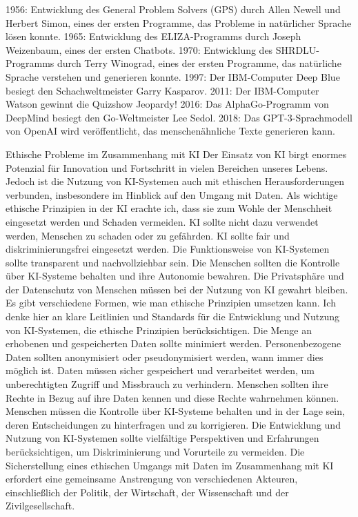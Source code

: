 \documentclass{article}
\begin{document}
1956: Entwicklung des General Problem Solvers (GPS) durch Allen Newell und Herbert Simon, eines der ersten Programme, das Probleme in natürlicher Sprache lösen konnte.
1965: Entwicklung des ELIZA-Programms durch Joseph Weizenbaum, eines der ersten Chatbots.
1970: Entwicklung des SHRDLU-Programms durch Terry Winograd, eines der ersten Programme, das natürliche Sprache verstehen und generieren konnte.
1997: Der IBM-Computer Deep Blue besiegt den Schachweltmeister Garry Kasparov.
2011: Der IBM-Computer Watson gewinnt die Quizshow Jeopardy!
2016: Das AlphaGo-Programm von DeepMind besiegt den Go-Weltmeister Lee Sedol.
2018: Das GPT-3-Sprachmodell von OpenAI wird veröffentlicht, das menschenähnliche Texte generieren kann.

Ethische Probleme im Zusammenhang mit KI
Der Einsatz von KI birgt enormes Potenzial für Innovation und Fortschritt in vielen Bereichen unseres Lebens. Jedoch ist die Nutzung von KI-Systemen auch mit ethischen Herausforderungen verbunden, insbesondere im Hinblick auf den Umgang mit Daten.
Als wichtige ethische Prinzipien in der KI erachte ich, dass sie zum Wohle der Menschheit eingesetzt werden und Schaden vermeiden.  KI sollte nicht dazu verwendet werden, Menschen zu schaden oder zu gefährden. KI sollte fair und diskriminierungsfrei eingesetzt werden. Die Funktionsweise von KI-Systemen sollte transparent und nachvollziehbar sein. Die Menschen sollten die Kontrolle über KI-Systeme behalten und ihre Autonomie bewahren. Die Privatsphäre und der Datenschutz von Menschen müssen bei der Nutzung von KI gewahrt bleiben.
Es gibt verschiedene Formen, wie man ethische Prinzipien umsetzen kann. Ich denke hier an klare Leitlinien und Standards für die Entwicklung und Nutzung von KI-Systemen, die ethische Prinzipien berücksichtigen. Die Menge an erhobenen und gespeicherten Daten sollte minimiert werden. Personenbezogene Daten sollten anonymisiert oder pseudonymisiert werden, wann immer dies möglich ist. Daten müssen sicher gespeichert und verarbeitet werden, um unberechtigten Zugriff und Missbrauch zu verhindern. Menschen sollten ihre Rechte in Bezug auf ihre Daten kennen und diese Rechte wahrnehmen können. Menschen müssen die Kontrolle über KI-Systeme behalten und in der Lage sein, deren Entscheidungen zu hinterfragen und zu korrigieren. Die Entwicklung und Nutzung von KI-Systemen sollte vielfältige Perspektiven und Erfahrungen berücksichtigen, um Diskriminierung und Vorurteile zu vermeiden.
Die Sicherstellung eines ethischen Umgangs mit Daten im Zusammenhang mit KI erfordert eine gemeinsame Anstrengung von verschiedenen Akteuren, einschließlich der Politik, der Wirtschaft, der Wissenschaft und der Zivilgesellschaft.
\end{document}
